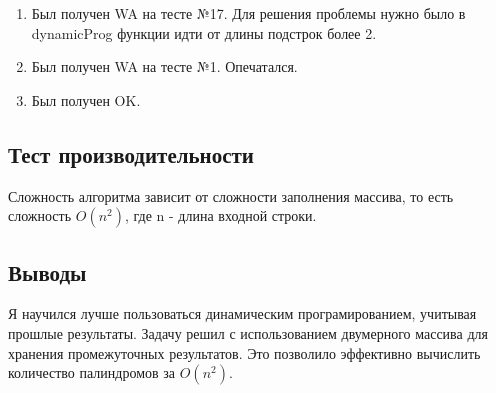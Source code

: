 \documentclass[12pt]{article}
\begin{document}
\begin{enumerate}
    \item Был получен WA на тесте №17. Для решения проблемы нужно было в dynamicProg функции идти от длины подстрок более 2.
    \item Был получен WA на тесте №1. Опечатался.
    \item Был получен OK.
\end{enumerate}

\newpage
\subsection*{Тест производительности}

Сложность алгоритма зависит от сложности заполнения массива, то есть сложность $O(n^2)$, где n - длина входной строки.



\newpage
\subsection*{Выводы}

Я научился лучше пользоваться динамическим програмированием, учитывая прошлые результаты. Задачу решил с использованием двумерного массива для хранения промежуточных результатов. Это позволило эффективно вычислить количество палиндромов за $O(n^2)$.
\end{document}
